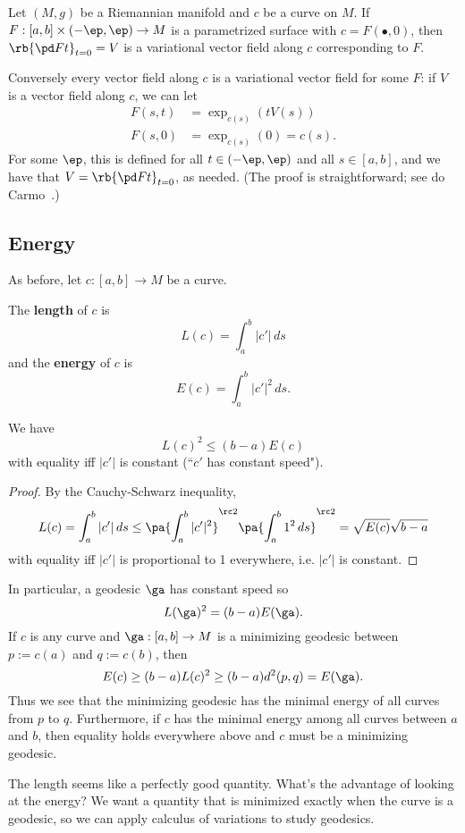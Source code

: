 
Let $(M,g)$ be a Riemannian manifold and $c$ be a curve on $M$. If $F:[a,b] \times (-\ep,\ep)\to M$ is a parametrized surface with $c=F(\bullet, 0)$, then $\rb{\pd Ft}_{t=0}=V$ is a variational vector field along $c$ corresponding to $F$.

Conversely every vector field along $c$ is a variational vector field for some $F$: 
if $V$ is a vector field along $c$, we can let
\begin{align}
F(s,t)&=\exp_{c(s)} (tV(s))\label{eq:965-18.1}\\
\nonumber F(s,0)&=\exp_{c(s)} (0) =c(s).
\end{align}
For some $\ep$, this is defined for all $t\in (-\ep,\ep)$ and all $s\in [a,b]$, and we have that $V=\rb{\pd Ft}_{t=0}$, as needed. (The proof is straightforward; see do Carmo~\cite[Prop. 9.2.2]{dC}.)

\subsection{Energy}
As before, let $c:[a,b]\to M$ be a curve. 
\begin{df}
The \textbf{length} of $c$ is
\[
L(c)=\int_a^b |c'|\,ds
\]
and the \textbf{energy} of $c$ is
\[
E(c)=\int_a^b |c'|^2\,ds.
\]
\end{df}
\begin{pr}
We have 
\[
L(c)^2\le (b-a)E(c)
\]
with equality iff $|c'|$ is constant (``$c'$ has constant speed").
\end{pr}
\begin{proof}
By the Cauchy-Schwarz inequality,
\[
L(c)=\int_a^b |c'|\,ds \le \pa{\int_a^b |c'|^2}^{\rc2} \pa{\int_a^b 1^2\,ds}^{\rc 2}=\sqrt{E(c)} \sqrt{b-a}
\]
with equality iff $|c'|$ is proportional to 1 everywhere, i.e. $|c'|$ is constant.
\end{proof}
In particular, a geodesic $\ga$ has constant speed so
\[
L(\ga)^2=(b-a)E(\ga).
\]
If $c$ is any curve and $\ga:[a,b]\to M$ is a minimizing geodesic between $p:=c(a)$ and $q:=c(b)$, then
\[
E(c)\ge (b-a)L(c)^2 \ge (b-a)d^2(p,q)=E(\ga).
\]
Thus we see that the minimizing geodesic has the minimal energy of all curves from $p$ to $q$. Furthermore, if $c$ has the minimal energy among all curves between $a$ and $b$, then equality holds everywhere above and $c$ must be a minimizing geodesic. %

The length seems like a perfectly good quantity. What's the advantage of looking at the energy? We want a quantity that is minimized exactly when the curve is a geodesic, so we can apply calculus of variations to study geodesics. 

